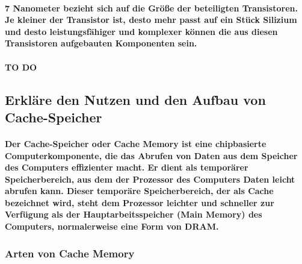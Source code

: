 \documentclass[a4paper]{article}
\begin{document}
    \paragraph{\color{codegreen}7 Nanometer bezieht sich auf die Größe der beteiligten Transistoren. Je kleiner der Transistor ist, desto mehr passt auf ein Stück Silizium und desto leistungsfähiger und komplexer können die aus diesen Transistoren aufgebauten Komponenten sein.}

    \paragraph{\large{TO DO}}

    \subsection{\color{red}Erkläre den Nutzen und den Aufbau von Cache-Speicher}\label{subsec:erkläre-den-nutzen-und-den-aufbau-von-cache-speicher}

    \paragraph{\color{codegreen} Der Cache-Speicher oder Cache Memory ist eine chipbasierte Computerkomponente, die das Abrufen von Daten aus dem Speicher des Computers effizienter macht. Er dient als temporärer Speicherbereich, aus dem der Prozessor des Computers Daten leicht abrufen kann. Dieser temporäre Speicherbereich, der als Cache bezeichnet wird, steht dem Prozessor leichter und schneller zur Verfügung als der Hauptarbeitsspeicher (Main Memory) des Computers, normalerweise eine Form von DRAM.}
    \subsubsection{\color{codegreen}Arten von Cache Memory}
\end{document}
